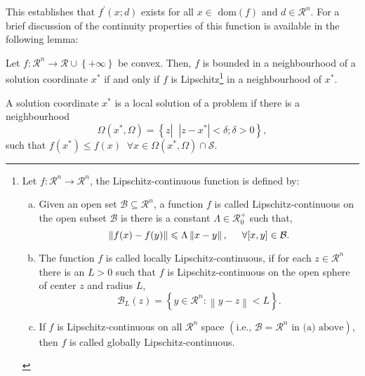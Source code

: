 This establishes that $f^{\prime}\left(x;d\right)$ exists for all $x\in\text{ dom}(f)$ and $d\in\mathcal{R}^{n}$. For a brief discussion of the continuity properties of this function is available in the following lemma:
\begin{lem}
    Let $f:\mathcal{R}^{n}\rightarrow\mathcal{R}\cup\left\{+\infty\right\}$ be convex. Then, $f$ is bounded in a neighbourhood of a solution coordinate $x^{\ast}$ if and only if $f$ is Lipschitz\footnote{
Let $f:\mathcal{R}^{n}\rightarrow\mathcal{R}^{n}$, the Lipschitz-continuous function is defined by:
    \begin{enumerate}[(a)]
       \item Given an open set $\mathcal{B}\subseteq\mathcal{R}^{n}$, a function $f$ is called Lipschitz-continuous on the open subset $\mathcal{B}$ is there is a constant $\Lambda\in\mathcal{R}_{0}^{+}$ such that,
           \begin{displaymath}
               \left\|f(x)-f(y)\right\| \le  \Lambda\left\|x-y\right\|, \hspace{.5cm} \forall[x,y]\in\mathcal{B}.
           \end{displaymath}
       \item The function $f$ is called locally Lipschitz-continuous, if for each $z\in\mathcal{R}^{n}$ there is an $L>0$ such that $f$ is Lipschitz-continuous on the open sphere of center $z$ and radius $L$,
           \begin{displaymath}
              \mathcal{B}_{L}(z) = \left\{y\in\mathcal{R}^{n} :\left\|y-z\right\| < L\right\}.
           \end{displaymath}
       \item If $f$ is Lipschitz-continuous on all $\mathcal{R}^{n}$ space $\left(\text{i.e., }\mathcal{B}=\mathcal{R}^{n}\text{ in (a) above}\right)$, then $f$ is called globally Lipschitz-continuous.

    \end{enumerate}}
 in a neighbourhood of $x^{\ast}$.
\end{lem}





\begin{defn}
   A solution coordinate $x^{\ast}$ is a local solution of a problem if there is a neighbourhood 
   \begin{displaymath}
           \Omega\left(x^{\ast},\Omega\right) = \left\{ z \left|\;\;\left|z-x^{\ast}\right| < \delta ; \delta > 0\right.\right\},
   \end{displaymath}
   such that $f\left(x^{\ast}\right)\leq f\left(x\right)\;\;\forall x\in\Omega\left(x^{\ast},\Omega\right) \cap \mathcal{S}$.
\end{defn}

